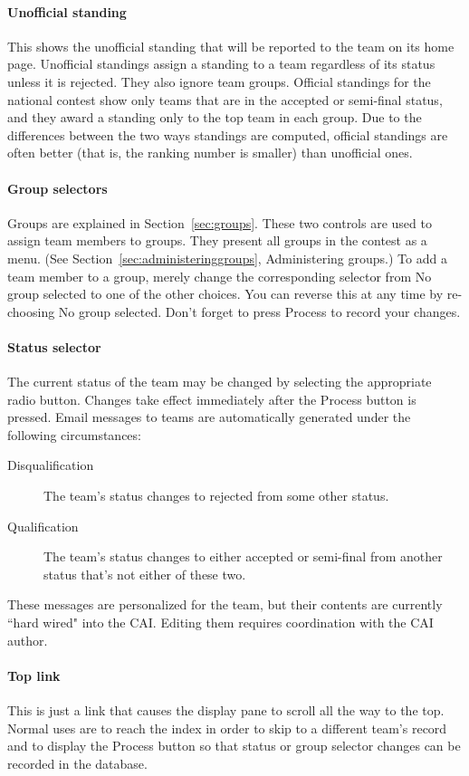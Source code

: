 \documentclass[11pt,letterpaper]{refart}
\def\ui#1{\textsf{#1}}
\begin{document}
\paragraph{Unofficial standing}
This shows the unofficial standing that will be reported to the team
on its home page. Unofficial standings assign a standing to a team
regardless of its status unless it is rejected. They also ignore team
groups. Official standings for the national contest show only teams
that are in the accepted or semi-final status, and they award a
standing only to the top team in each group. Due to the differences
between the two ways standings are computed, official standings are
often better (that is, the ranking number is smaller) than unofficial
ones.

\paragraph{Group selectors}
Groups are explained in Section~\ref{sec:groups}.
These two controls are used to assign team members to groups.
They present all groups in the contest as a menu.
(See Section~\ref{sec:administeringgroups}, Administering groups.)
To add a team member to a
group, merely change the corresponding selector
from \ui{No group selected} to one
of the other choices. You can reverse this at any time by re-choosing
\ui{No group selected}. Don't forget to press
\ui{Process} to record your changes.

\paragraph{Status selector}
The current status of the team may be changed by selecting the
appropriate radio button. Changes take effect immediately after the
\ui{Process} button is pressed. Email messages to teams are
automatically generated under the following circumstances:
\begin{description}
\item[Disqualification] The team's status changes to rejected from some other status.
\item[Qualification] The team's status changes to either accepted or
semi-final from another status that's not either of these two.
\end{description}
These messages are personalized for the team, but their contents are currently
``hard wired" into the CAI. Editing them requires coordination with the CAI 
author.

\paragraph{Top link}
This is just a link that causes the display pane to scroll all the way
to the top. Normal uses are to reach the index in order to skip to a
different team's record and to display the \ui{Process} button so that
status or group selector changes can be recorded in the database.
\end{document}
